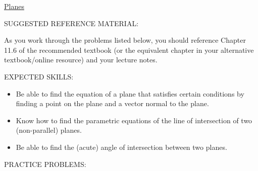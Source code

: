 \documentclass[12pt]{article}
\begin{document}
\begin{center}
\underline{\LARGE{Planes}}
\end{center}

\noindent SUGGESTED REFERENCE MATERIAL:

\bigskip

\noindent As you work through the problems listed below, you should reference Chapter 11.6 of the recommended textbook (or the equivalent chapter in your alternative textbook/online resource) and your lecture notes.

\bigskip

\noindent EXPECTED SKILLS:

\begin{itemize}

\item Be able to find the equation of a plane that satisfies certain conditions by finding a point on the plane and a vector normal to the plane. 

\item Know how to find the parametric equations of the line of intersection of two (non-parallel) planes. 

\item Be able to find the (acute) angle of intersection between two planes.

\end{itemize}

\noindent PRACTICE PROBLEMS:

\medskip
\end{document}
